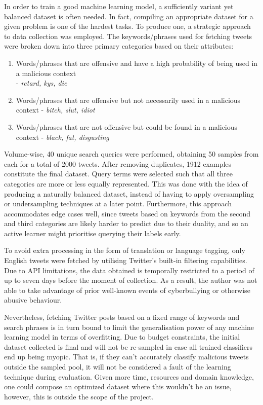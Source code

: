 \documentclass[a4paper,12pt]{article}
\begin{document}
In order to train a good machine learning model, a sufficiently variant yet balanced dataset is often needed. In fact, compiling an appropriate dataset for a given problem is one of the hardest tasks. To produce one, a strategic approach to data collection was employed.
The keywords/phrases used for fetching tweets were broken down into three primary categories based on their attributes:
\begin{enumerate}
    \item Words/phrases that are offensive and have a high probability of being used in a malicious context\\ - \emph{retard, kys, die}\footnotemark
    \item Words/phrases that are offensive but not necessarily used in a malicious context - \emph{bitch, slut, idiot}\footnotemark[\value{footnote}]
    \item Words/phrases that are not offensive but could be found in a malicious context - \emph{black, fat, disgusting}\footnotemark[\value{footnote}]
\end{enumerate}
Volume-wise, 40 unique search queries were performed, obtaining 50 samples from each for a total of 2000 tweets. After removing duplicates, 1912 examples constitute the final dataset. Query terms were selected such that all three categories are more or less equally represented. This was done with the idea of producing a naturally balanced dataset, instead of having to apply oversampling or undersampling techniques at a later point. Furthermore, this approach accommodates edge cases well, since tweets based on keywords from the second and third categories are likely harder to predict due to their duality, and so an active learner might prioritise querying their labels early.

To avoid extra processing in the form of translation or language tagging, only English tweets were fetched by utilising Twitter's built-in filtering capabilities.
Due to API limitations, the data obtained is temporally restricted to a period of up to seven days before the moment of collection. As a result, the author was not able to take advantage of prior well-known events of cyberbullying or otherwise abusive behaviour.

Nevertheless, fetching Twitter posts based on a fixed range of keywords and search phrases is in turn bound to limit the generalisation power of any machine learning model in terms of overfitting. Due to budget constraints, the initial dataset collected is final and will not be re-sampled in case all trained classifiers end up being myopic. That is, if they can't accurately classify malicious tweets outside the sampled pool, it will not be considered a fault of the learning technique during evaluation. Given more time, resources and domain knowledge, one could compose an optimized dataset where this wouldn't be an issue, however, this is outside the scope of the project.
\end{document}
